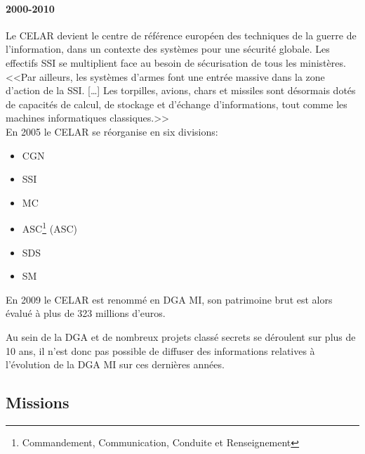 \documentclass[11pt, book, english, french, standardlists]{upmethodology-document}
\begin{document}
				\paragraph*{2000-2010}
					Le \gls{CELAR} devient le centre de référence européen des techniques de la guerre de l'information, dans un contexte des systèmes pour une sécurité globale. Les effectifs \gls{SSI} se multiplient face au besoin de sécurisation de tous les ministères. <<Par ailleurs, les systèmes d'armes font une entrée massive dans la zone d'action de la \gls{SSI}. [\ldots] Les torpilles, avions, chars et missiles sont désormais dotés de capacités de calcul, de stockage et d'échange d'informations, tout comme les machines informatiques classiques.>>\cite{CELAR40ansAvenir}\\
					En 2005 le \gls{CELAR} se réorganise en six divisions:
					\begin{itemize}
						\item \acrfull{CGN}
						\item \acrfull{SSI}
						\item \acrfull{MC}
						\item \acrlong{ASC}\footnote{Commandement, Communication, Conduite et Renseignement} (\acrshort{ASC})
						\item \acrfull{SDS}
						\item \acrfull{SM}
					\end{itemize}
					En 2009 le \gls{CELAR} est renommé en \acrfull{DGA MI}, son patrimoine brut est alors évalué à plus de 323 millions d'euros.
				\noindent\vspace{-7mm}
					\begin{upmcaution}
						Au sein de la \gls{DGA} et de nombreux projets classé secrets se déroulent sur plus de 10 ans, il n'est donc pas possible de diffuser des informations relatives à l'évolution de la \gls{DGA MI} sur ces dernières années.
					\end{upmcaution}
			\subsection{Missions}
\end{document}

